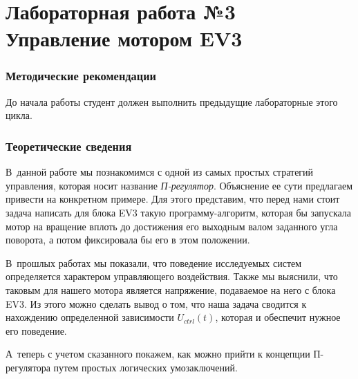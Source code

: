 \documentclass[12pt,a4paper,openany]{extarticle}
\begin{document}
\part*{Лабораторная работа №3\\
Управление мотором EV3}

\section{Методические рекомендации}
\hspace*{\parindent}До начала работы студент должен выполнить предыдущие лабораторные этого цикла.

\section{Теоретические сведения}
\hspace*{\parindent}В~данной работе мы познакомимся с одной из самых простых стратегий управления, которая носит название \textit{П-регулятор}.
Объяснение ее сути предлагаем привести на конкретном примере.
Для этого представим, что перед нами стоит задача написать для блока EV3 такую программу-алгоритм, которая бы запускала мотор на вращение вплоть до достижения его выходным валом заданного угла поворота, а потом фиксировала бы его в этом положении.

В~прошлых работах мы показали, что поведение исследуемых систем определяется характером управляющего воздействия.
Также мы выяснили, что таковым для нашего мотора является напряжение, подаваемое на него с блока EV3.
Из этого можно сделать вывод о том, что наша задача сводится к нахождению определенной зависимости $U_{ctrl}(t)$, которая и обеспечит нужное его поведение.

А~теперь с учетом сказанного покажем, как можно прийти к концепции П-регулятора путем простых логических умозаключений.
\end{document}
